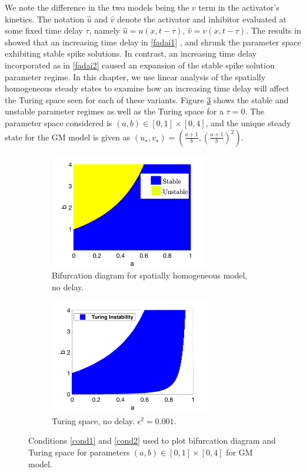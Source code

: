 We note the difference in the two models being the $v$ term in the activator's kinetics. The notation $\hat{u}$ and $\hat{v}$ denote the activator and inhibitor evaluated at some fixed time delay $\tau$, namely $\hat{u}=u(x,t-\tau)$, $\hat{v}=v(x,t-\tau)$. The results in \cite{fadai1,fadai2} showed that an increasing time delay in \eqref{fadai1} , and shrunk the parameter space exhibiting stable spike solutions. In contrast, an increasing time delay incorporated as in \eqref{fadai2} caused an expansion of the stable spike solution parameter regime. In this chapter, we use linear analysis of the spatially homogeneous steady states to examine how an increasing time delay will affect the Turing space seen for each of these variants. Figure \ref{fig:gmspace} shows the stable and unstable parameter regimes as well as the Turing space for a $\tau=0$. The parameter space considered is $(a,b)\in[0,1]\times[0,4]$, and the unique steady state for the GM model is given as $(u_\star,v_\star)=\left(\frac{a+1}{b},\left(\frac{a+1}{b}\right)^2\right)$.

\begin{figure}[H]
    \centering
    \begin{subfigure}[t]{0.45\textwidth}
        \centering
        \includegraphics[width=7cm,height = 5cm]{bifgm.png}
        \caption{Bifurcation diagram for spatially homogeneous model, no delay.}
        \label{fig:bifgm}
    \end{subfigure}
    \hfill
    \begin{subfigure}[t]{0.45\textwidth}
        \centering
        \includegraphics[width=7cm,height = 5cm]{turingspacegm.png}
        \caption{Turing space, no delay. $\epsilon^2=0.001$.}
        \label{fig:turingspacegm}
    \end{subfigure}
    \caption{Conditions \eqref{cond1} and \eqref{cond2} used to plot bifurcation diagram and Turing space for parameters $(a,b)\in[0,1]\times[0,4]$ for GM model.}
    \label{fig:gmspace}
\end{figure}

